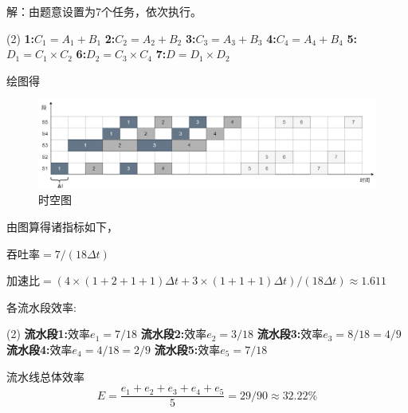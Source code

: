 \documentclass[12pt,a4paper,utf8]{ctexart}
\begin{document}
\begin{enumerate}
解：由题意设置为7个任务，依次执行。
\begin{tasks}(2)
	\task \textbf{1:}\quad $ C_1 = A_1 + B_1 $
	\task \textbf{2:}\quad $ C_2 = A_2 + B_2 $
	\task \textbf{3:}\quad $ C_3 = A_3 + B_3 $
	\task \textbf{4:}\quad $ C_4 = A_4 + B_4 $
	\task \textbf{5:}\quad $ D_1 = C_1 \times C_2 $ 
	\task \textbf{6:}\quad $ D_2 = C_3 \times C_4 $
	\task \textbf{7:}\quad $ D = D_1 \times D_2 $
\end{tasks}
绘图得
\begin{figure}[htbp]
	\centering
	\includegraphics[width=0.9\linewidth]{EX6}
	\caption{时空图}
	\label{fig:ex6}
\end{figure}

由图算得诸指标如下，

吞吐率$ = 7/(18\Delta t) $

加速比$ =  (4 \times (1+2+1+1)\Delta t + 3\times (1+1+1)\Delta t) /(18\Delta t) \approx 1.611  $

各流水段效率:
\begin{tasks}(2)
	\task \textbf{流水段1:}\quad 效率$ e_1 = 7/18 $
	\task \textbf{流水段2:}\quad 效率$ e_2 = 3/18 $
	\task \textbf{流水段3:}\quad 效率$ e_3 = 8/18 = 4/9 $
	\task \textbf{流水段4:}\quad 效率$ e_4 = 4/18 = 2/9 $
	\task \textbf{流水段5:}\quad 效率$ e_5 = 7/18$ 
\end{tasks}
流水线总体效率
$$E = \frac{e_1+e_2+e_3+e_4+e_5}{5} = 29/90 \approx 32.22\%$$


\end{enumerate}
\end{document}
